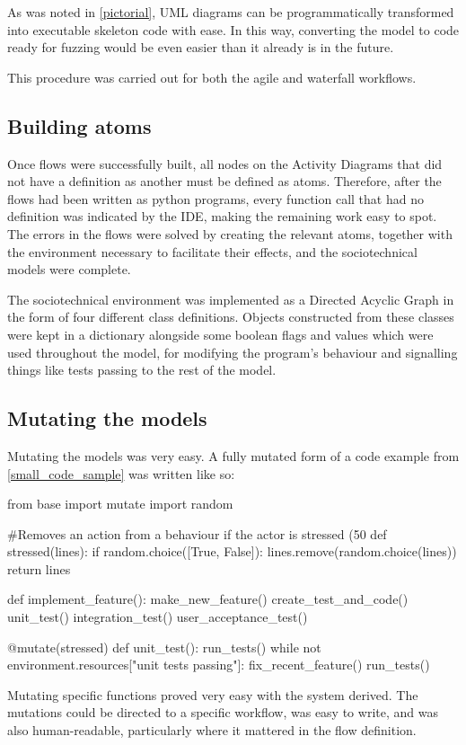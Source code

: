 As was noted in \cref{pictorial}, UML diagrams can be programmatically transformed into executable skeleton code with ease. In this way, converting the model to code ready for fuzzing would be even easier than it already is in the future. \par

This procedure was carried out for both the agile and waterfall workflows. 

\subsection{Building atoms}
Once flows were successfully built, all nodes on the Activity Diagrams that did not have a definition as another must be defined as atoms. Therefore, after the flows had been written as python programs, every function call that had no definition was indicated by the IDE, making the remaining work easy to spot. The errors in the flows were solved by creating the relevant atoms, together with the environment necessary to facilitate their effects, and the sociotechnical models were complete. \par

The sociotechnical environment was implemented as a Directed Acyclic Graph in the form of four different class definitions. Objects constructed from these classes were kept in a dictionary alongside some boolean flags and values which were used throughout the model, for modifying the program's behaviour and signalling things like tests passing to the rest of the model. \par

\subsection{Mutating the models}
Mutating the models was very easy. A fully mutated form of a code example from \cref{small_code_sample} was written like so:

\begin{pyglist}[language = python, encoding = utf8]
from base import mutate
import random

#Removes an action from a behaviour if the actor is stressed (50%
def stressed(lines):
    if random.choice([True, False]):
        lines.remove(random.choice(lines))
    return lines
    

def implement_feature():
    make_new_feature()
    create_test_and_code()
    unit_test()
    integration_test()
    user_acceptance_test()

@mutate(stressed)
def unit_test():
    run_tests()
    while not environment.resources["unit tests passing"]:
        fix_recent_feature()
        run_tests()
\end{pyglist}\par
Mutating specific functions proved very easy with the system derived. The mutations could be directed to a specific workflow, was easy to write, and was also human-readable, particularly where it mattered in the flow definition.\par

